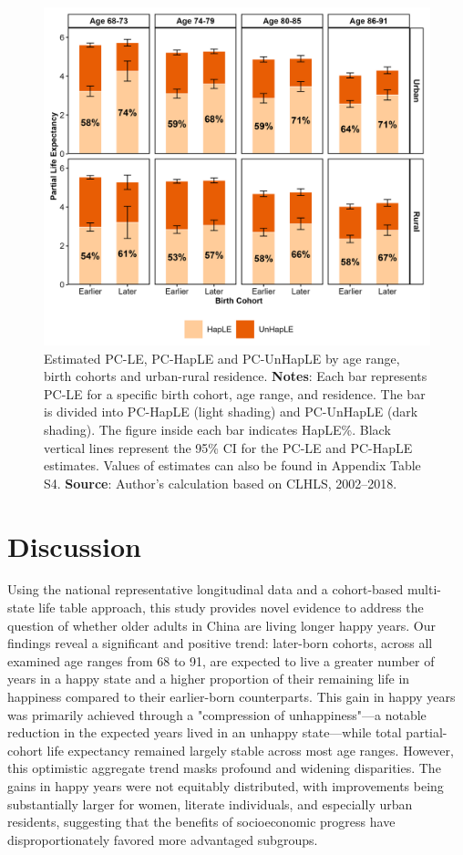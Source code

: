 \documentclass[12pt, a4paper]{article}
\begin{document}
\begin{figure}[!p]
  \centering
  \includegraphics[width=1\textwidth]{fig_tabs_b300/2_4_HapLE_stacked_plots_urban.png}
  \caption{Estimated PC-LE, PC-HapLE and PC-UnHapLE by age range, birth cohorts and urban-rural residence. \textbf{Notes}: Each bar represents PC-LE for a specific birth cohort, age range, and residence. The bar is divided into PC-HapLE (light shading) and PC-UnHapLE (dark shading). The figure inside each bar indicates HapLE\%. Black vertical lines represent the 95\% CI for the PC-LE and PC-HapLE estimates. Values of estimates can also be found in Appendix Table S4. \textbf{Source}: Author's calculation based on CLHLS, 2002–2018.}
\end{figure}

\section{Discussion}

Using the national representative longitudinal data and a cohort-based multi-state life table approach, this study provides novel evidence to address the question of whether older adults in China are living longer happy years. Our findings reveal a significant and positive trend: later-born cohorts, across all examined age ranges from 68 to 91, are expected to live a greater number of years in a happy state and a higher proportion of their remaining life in happiness compared to their earlier-born counterparts. This gain in happy years was primarily achieved through a "compression of unhappiness"—a notable reduction in the expected years lived in an unhappy state—while total partial-cohort life expectancy remained largely stable across most age ranges. However, this optimistic aggregate trend masks profound and widening disparities. The gains in happy years were not equitably distributed, with improvements being substantially larger for women, literate individuals, and especially urban residents, suggesting that the benefits of socioeconomic progress have disproportionately favored more advantaged subgroups.
\end{document}
